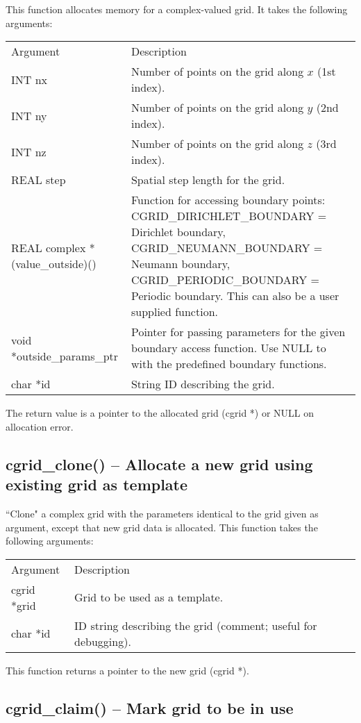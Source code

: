 \documentclass[12pt,letterpaper]{report}
\begin{document}
This function allocates memory for a complex-valued grid. It takes the following arguments:
\begin{longtable}{p{} p{}}
Argument & Description\\
\cline{1-2}
INT nx & Number of points on the grid along $x$ (1st index).\\
INT ny & Number of points on the grid along $y$ (2nd index).\\
INT nz & Number of points on the grid along $z$ (3rd index).\\
REAL step & Spatial step length for the grid.\\
REAL complex *(value\_outside)() & Function for accessing boundary points: CGRID\_DIRICHLET\_BOUNDARY = Dirichlet boundary, CGRID\_NEUMANN\_BOUNDARY = Neumann boundary, CGRID\_PERIODIC\_BOUNDARY  = Periodic boundary. This can also be a user supplied function.\\
void *outside\_params\_ptr & Pointer for passing parameters for the given boundary access function. Use NULL to with the predefined boundary functions.\\
char *id & String ID describing the grid.
\end{longtable}
\noindent
The return value is a pointer to the allocated grid (cgrid *) or NULL on allocation error.

\subsection{cgrid\_clone() -- Allocate a new grid using existing grid as template}

``Clone" a complex grid with the parameters identical to the grid given as argument,  except that new grid data is allocated. This function takes the following arguments:
\begin{longtable}{p{} p{}}
Argument & Description\\
\cline{1-2}
cgrid *grid & Grid to be used as a template.\\
char *id & ID string describing the grid (comment; useful for debugging).\\
\end{longtable}
\noindent
This function returns a pointer to the new grid (cgrid *).

\subsection{cgrid\_claim() -- Mark grid to be in use}
\end{document}
